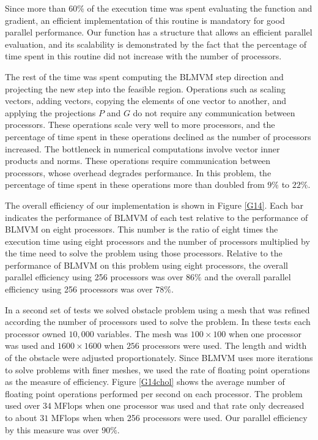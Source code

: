 Since more than $60\%$ of the execution time was spent
evaluating the function and gradient,
an efficient implementation of this routine is mandatory for good 
parallel performance.
Our function has a structure that allows an efficient parallel evaluation,
and its scalability is demonstrated by the fact that the percentage of
time spent in this routine did not increase with the number of processors.

The rest of the time was spent computing the BLMVM step direction and
projecting the new step into the feasible region.  Operations such as
scaling vectors, adding vectors,
copying the elements of one vector to another, and applying the projections 
$P$ and $G$  do not require any communication between processors.
These operations scale very well to more processors, and the percentage
of time spent in these operations declined as the number of processors 
increased.  The bottleneck in numerical computations involve
vector inner products and norms.  
These operations require communication between processors, whose overhead
degrades performance.
In this problem, the percentage of time spent in these operations 
more than doubled from $9\%$ to $22\%$.  

The overall efficiency of our implementation is shown in Figure \ref{G14}.
Each bar indicates the performance of BLMVM of each test relative to
the performance of BLMVM on eight processors.  
This number is the ratio of eight times the execution time using 
eight processors and the number of processors multiplied by the
time need to solve the problem using those processors.
Relative to the performance of BLMVM on this problem using eight processors,
the overall parallel efficiency using 256 processors was over $86\%$
and the overall parallel efficiency using 256 processors was over $78\%$.

In a second set of tests we solved obstacle problem using a mesh that was
refined according the number of processors used to solve the problem.
In these tests each processor owned $10,000$ variables.
The mesh was $100 \times 100$ when one processor was used and 
$1600 \times 1600$ when $256$ processors were used.  The length
and width of the obstacle were adjusted proportionately.  Since BLMVM
uses more iterations to solve problems with  finer meshes, we used
the rate of floating point operations as the measure of efficiency.
Figure \ref{G14chol} shows the average number of floating point operations
performed per second on each processor.  The problem used over $34$ MFlops when
one processor was used and that rate only decreased to about  $31$ MFlops when
when 256 processors were used.
Our parallel efficiency by this measure was over $90\%$.


